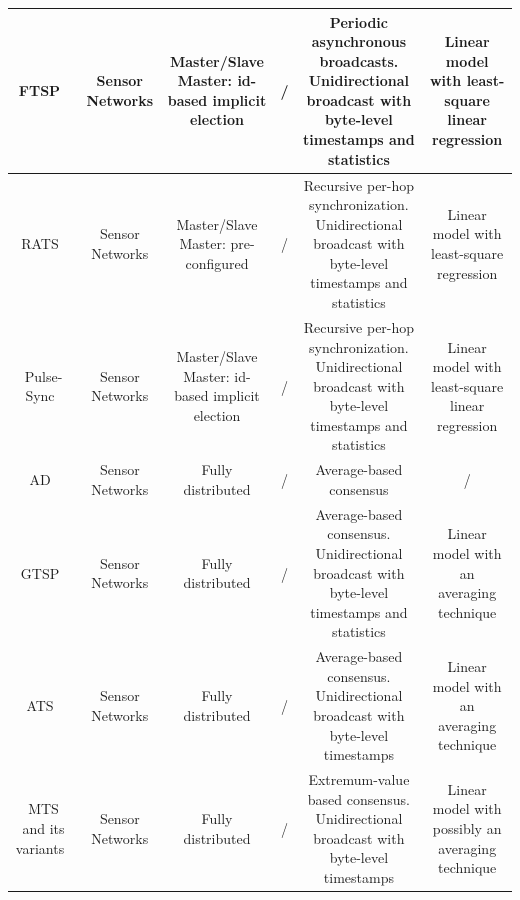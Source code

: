{\begin{table}[h!]
\begin{center}
{\begin{tabular} {|C{\lenOneThree}|C{\lenZero}|C{\lenTwoOne}|C{\lenMinusOne}|C{\lenFour}|C{\lenOneFour}|}
					FTSP~\cite{maroti2004flooding} & Sensor Networks & Master/Slave Master: id-based implicit election& / & Periodic asynchronous broadcasts. Unidirectional broadcast with byte-level timestamps and statistics & Linear model with least-square linear regression \\
					\hline
					RATS~\cite{kusy2007spatiotemporal} & Sensor Networks & Master/Slave Master: pre-configured & / &  Recursive per-hop synchronization. Unidirectional broadcast with byte-level timestamps and statistics & Linear model with least-square regression\\
					\hline				
					Pulse-Sync~\cite{lenzen2009optimal,lenzen2015pulsesync} & Sensor Networks & Master/Slave Master: id-based implicit election& / & Recursive per-hop synchronization. Unidirectional broadcast with byte-level timestamps and statistics & Linear model with least-square linear regression \\
					\hline
					AD~\cite{li2006global} & Sensor Networks & Fully distributed & / & Average-based consensus & / \\
					\hline			
					GTSP~\cite{sommer2009gradient} & Sensor Networks & Fully distributed & / & Average-based consensus. Unidirectional broadcast with byte-level timestamps and statistics & Linear model with an averaging technique\\
					\hline
					ATS~\cite{schenato2011average} & Sensor Networks & Fully distributed & / & Average-based consensus. Unidirectional broadcast with byte-level timestamps & Linear model with an averaging technique\\
					\hline
					MTS and its variants~\cite{he2014time,he2014study} & Sensor Networks & Fully distributed & / & Extremum-value based consensus. Unidirectional broadcast with byte-level timestamps & Linear model with possibly an averaging technique\\
					\hline

\end{tabular}}
\end{center}
\end{table}}

